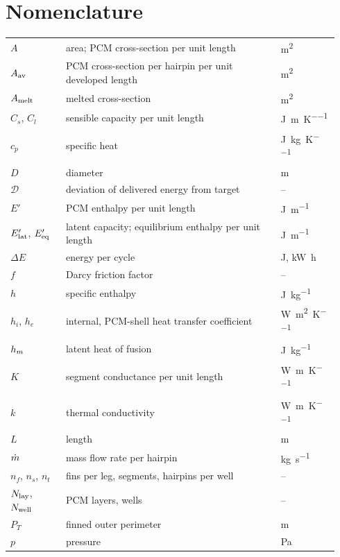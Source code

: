 \section*{Nomenclature}
\begingroup\small
\begin{longtable}{@{}p{0.16\linewidth}p{0.62\linewidth}p{0.16\linewidth}@{}}
$A$ & area; PCM cross-section per unit length & \si{\meter\squared}\\
$A_{\mathrm{av}}$ & PCM cross-section per hairpin per unit developed length & \si{\meter\squared}\\
$A_{\mathrm{melt}}$ & melted cross-section & \si{\meter\squared}\\
$C_s$, $C_l$ & sensible capacity per unit length & \si{\joule\per\meter\per\kelvin}\\
$c_p$ & specific heat & \si{\joule\per\kilogram\per\kelvin}\\
$D$ & diameter & \si{\meter}\\
$\mathcal D$ & deviation of delivered energy from target & --\\
$E'$ & PCM enthalpy per unit length & \si{\joule\per\meter}\\
$E'_{\mathrm{lat}}$, $E'_{\mathrm{eq}}$ & latent capacity; equilibrium enthalpy per unit length & \si{\joule\per\meter}\\
$\Delta E$ & energy per cycle & \si{\joule}, \si{\kilo\watt\hour}\\
$f$ & Darcy friction factor & --\\
$h$ & specific enthalpy & \si{\joule\per\kilogram}\\
$h_i$, $h_e$ & internal, PCM-shell heat transfer coefficient & \si{\watt\per\meter\squared\per\kelvin}\\
$h_{m}$ & latent heat of fusion & \si{\joule\per\kilogram}\\
$K$ & segment conductance per unit length & \si{\watt\per\meter\per\kelvin}\\
$k$ & thermal conductivity & \si{\watt\per\meter\per\kelvin}\\
$L$ & length & \si{\meter}\\
$\dot m$ & mass flow rate per hairpin & \si{\kilogram\per\second}\\
$n_f$, $n_s$, $n_t$ & fins per leg, segments, hairpins per well & --\\
$N_{\mathrm{lay}}$, $N_{\mathrm{well}}$ & PCM layers, wells & --\\
$P_T$ & finned outer perimeter & \si{\meter}\\
$p$ & pressure & \si{\pascal}\\

\end{longtable}
